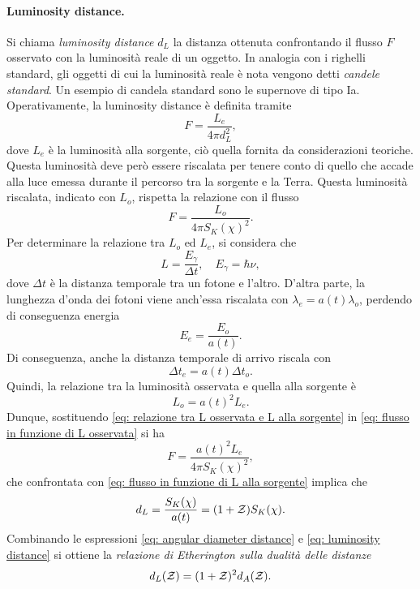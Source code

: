 \paragraph{Luminosity distance.} Si chiama \emph{luminosity distance} $d_L$ la distanza ottenuta confrontando il flusso $F$ osservato con la luminosità reale di un oggetto. In analogia con i righelli standard, gli oggetti di cui la luminosità reale è nota vengono detti \emph{candele standard}. Un esempio di candela standard sono le supernove di tipo Ia. Operativamente, la luminosity distance è definita tramite
\begin{equation}
\label{eq: flusso in funzione di L alla sorgente}
    F = \frac{L_e}{4\pi d_L^2},    
\end{equation}
dove $L_e$ è la luminosità alla sorgente, ciò quella fornita da considerazioni teoriche. Questa luminosità deve però essere riscalata per tenere conto di quello che accade alla luce emessa durante il percorso tra la sorgente e la Terra. Questa luminosità riscalata, indicato con $L_o$, rispetta la relazione con il flusso
\begin{equation}
\label{eq: flusso in funzione di L osservata}
    F = \frac{L_o}{4\pi S_K(\chi)^2}.
\end{equation}
Per determinare la relazione tra $L_o$ ed $L_e$, si considera che 
\begin{equation}
    L = \frac{E_\gamma}{\Delta t},\quad E_\gamma = \hbar\nu,
\end{equation}
dove $\Delta t$ è la distanza temporale tra un fotone e l'altro. D'altra parte, la lunghezza d'onda dei fotoni viene anch'essa riscalata con $\lambda_e = a(t)\lambda_o$, perdendo di conseguenza energia
\begin{equation}
    E_e = \frac{E_o}{a(t)}.
\end{equation}
Di conseguenza, anche la distanza temporale di arrivo riscala con 
\begin{equation}
    \Delta t_e = a(t)\Delta t_o.
\end{equation}
Quindi, la relazione tra la luminosità osservata e quella alla sorgente è
\begin{equation}
\label{eq: relazione tra L osservata e L alla sorgente}
    L_o = a(t)^2L_e.
\end{equation}
Dunque, sostituendo \eqref{eq: relazione tra L osservata e L alla sorgente} in \eqref{eq: flusso in funzione di L osservata} si ha
\begin{equation}
    F = \frac{a(t)^2L_e}{4\pi S_K(\chi)^2},
\end{equation}
che confrontata con \eqref{eq: flusso in funzione di L alla sorgente} implica che 
\begin{equation}
\label{eq: luminosity distance}
    d_L = \frac{S_K(\chi)}{a(t)} = (1 + \mathcal{Z})S_K(\chi).
\end{equation}
Combinando le espressioni \eqref{eq: angular diameter distance} e \eqref{eq: luminosity distance} si ottiene la \emph{relazione di Etherington sulla dualità delle distanze}
\begin{equation}
\label{eq: relazione di Etherington}
    d_L(\mathcal{Z}) = (1 + \mathcal{Z})^2d_A(\mathcal{Z}).
\end{equation}

